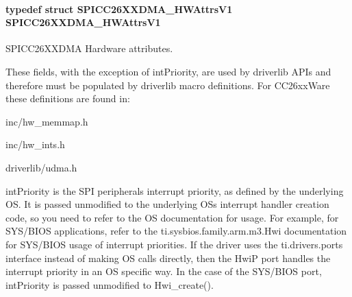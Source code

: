 \paragraph[{S\+P\+I\+C\+C26\+X\+X\+D\+M\+A\+\_\+\+H\+W\+Attrs\+V1}]{\setlength{\rightskip}{0pt plus 5cm}typedef struct {\bf S\+P\+I\+C\+C26\+X\+X\+D\+M\+A\+\_\+\+H\+W\+Attrs\+V1}  {\bf S\+P\+I\+C\+C26\+X\+X\+D\+M\+A\+\_\+\+H\+W\+Attrs\+V1}}\label{_s_p_i_c_c26_x_x_d_m_a_8h_a17117d67b0bd141d91110f2c5bfaa9cf}


S\+P\+I\+C\+C26\+X\+X\+D\+M\+A Hardware attributes. 

These fields, with the exception of int\+Priority, are used by driverlib A\+P\+Is and therefore must be populated by driverlib macro definitions. For C\+C26xx\+Ware these definitions are found in\+:
\begin{DoxyItemize}
\item inc/hw\+\_\+memmap.\+h
\item inc/hw\+\_\+ints.\+h
\item driverlib/udma.\+h
\end{DoxyItemize}

int\+Priority is the S\+P\+I peripheral\textquotesingle{}s interrupt priority, as defined by the underlying O\+S. It is passed unmodified to the underlying O\+S\textquotesingle{}s interrupt handler creation code, so you need to refer to the O\+S documentation for usage. For example, for S\+Y\+S/\+B\+I\+O\+S applications, refer to the ti.\+sysbios.\+family.\+arm.\+m3.\+Hwi documentation for S\+Y\+S/\+B\+I\+O\+S usage of interrupt priorities. If the driver uses the ti.\+drivers.\+ports interface instead of making O\+S calls directly, then the Hwi\+P port handles the interrupt priority in an O\+S specific way. In the case of the S\+Y\+S/\+B\+I\+O\+S port, int\+Priority is passed unmodified to Hwi\+\_\+create().

